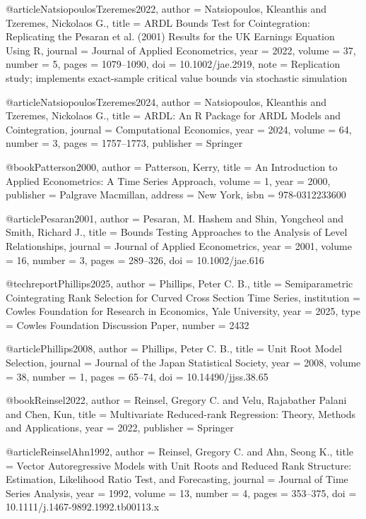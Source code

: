 @article{NatsiopoulosTzeremes2022,
	author  = {Natsiopoulos, Kleanthis and Tzeremes, Nickolaos G.},
	title   = {{ARDL} Bounds Test for Cointegration: Replicating the {Pesaran} et al. (2001) Results for the {UK} Earnings Equation Using {R}},
	journal = {Journal of Applied Econometrics},
	year    = {2022},
	volume  = {37},
	number  = {5},
	pages   = {1079--1090},
	doi     = {10.1002/jae.2919},
	note    = {Replication study; implements exact-sample critical value bounds via stochastic simulation}
}

@article{NatsiopoulosTzeremes2024,
	author  = {Natsiopoulos, Kleanthis and Tzeremes, Nickolaos G.},
	title   = {{ARDL}: An {R} Package for {ARDL} Models and Cointegration},
	journal = {Computational Economics},
	year    = {2024},
	volume  = {64},
	number  = {3},
	pages   = {1757--1773},
	publisher = {Springer}
}

@book{Patterson2000,
	author    = {Patterson, Kerry},
	title     = {An Introduction to Applied Econometrics: A Time Series Approach},
	volume    = {1},
	year      = {2000},
	publisher = {Palgrave Macmillan},
	address   = {New York},
	isbn      = {978-0312233600}
}

@article{Pesaran2001,
	author  = {Pesaran, M. Hashem and Shin, Yongcheol and Smith, Richard J.},
	title   = {Bounds Testing Approaches to the Analysis of Level Relationships},
	journal = {Journal of Applied Econometrics},
	year    = {2001},
	volume  = {16},
	number  = {3},
	pages   = {289--326},
	doi     = {10.1002/jae.616}
}

@techreport{Phillips2025,
	author      = {Phillips, Peter C. B.},
	title       = {Semiparametric Cointegrating Rank Selection for Curved Cross Section Time Series},
	institution = {Cowles Foundation for Research in Economics, Yale University},
	year        = {2025},
	type        = {Cowles Foundation Discussion Paper},
	number      = {2432}
}

@article{Phillips2008,
	author  = {Phillips, Peter C. B.},
	title   = {Unit Root Model Selection},
	journal = {Journal of the Japan Statistical Society},
	year    = {2008},
	volume  = {38},
	number  = {1},
	pages   = {65--74},
	doi     = {10.14490/jjss.38.65}
}

@book{Reinsel2022,
	author    = {Reinsel, Gregory C. and Velu, Rajabather Palani and Chen, Kun},
	title     = {Multivariate Reduced-rank Regression: Theory, Methods and Applications},
	year      = {2022},
	publisher = {Springer}
}

@article{ReinselAhn1992,
	author  = {Reinsel, Gregory C. and Ahn, Seong K.},
	title   = {Vector Autoregressive Models with Unit Roots and Reduced Rank Structure: Estimation, Likelihood Ratio Test, and Forecasting},
	journal = {Journal of Time Series Analysis},
	year    = {1992},
	volume  = {13},
	number  = {4},
	pages   = {353--375},
	doi     = {10.1111/j.1467-9892.1992.tb00113.x}
}

